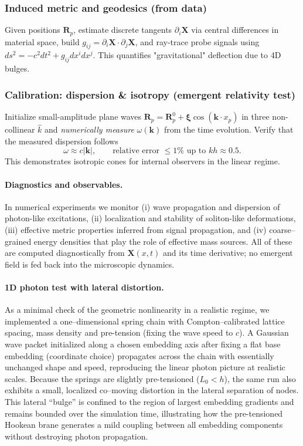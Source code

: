 \subsubsection{Induced metric and geodesics (from data)}\label{induced-metric-and-geodesics}

Given positions $\mathbf R_p$, estimate discrete tangents $\partial_i\mathbf X$ via central differences in material space, build $g_{ij}=\partial_i\mathbf X\cdot\partial_j\mathbf X$, and ray-trace probe signals using $ds^2=-c^2dt^2+g_{ij}dx^i dx^j$. This quantifies "gravitational" deflection due to 4D bulges.

\subsubsection{Calibration: dispersion \& isotropy (emergent relativity test)}\label{calibration-dispersion-isotropy}

Initialize small-amplitude plane waves $\mathbf R_p=\mathbf R^0_p+\boldsymbol\xi\cos(\mathbf k\cdot x_p)$ in three non-collinear $\hat k$ and \emph{numerically measure} $\omega(\mathbf k)$ from the time evolution. Verify that the measured dispersion follows
\[
\omega \approx c|\mathbf k|,\qquad
\text{relative error } \le 1\% \text{ up to } kh\approx0.5.
\]
This demonstrates isotropic cones for internal observers in the linear regime.

\paragraph{Diagnostics and observables.}
In numerical experiments we monitor (i) wave propagation and dispersion of
photon-like excitations, (ii) localization and stability of soliton-like
deformations, (iii) effective metric properties inferred from signal
propagation, and (iv) coarse–grained energy densities that play the role of
effective mass sources. All of these are computed diagnostically from
$\mathbf X(x,t)$ and its time derivative; no emergent field is fed back into
the microscopic dynamics.

\paragraph{1D photon test with lateral distortion.}
As a minimal check of the geometric nonlinearity in a realistic regime, we
implemented a one–dimensional spring chain with Compton–calibrated lattice
spacing, mass density and pre-tension (fixing the wave speed to $c$). A
Gaussian wave packet initialized along a chosen embedding axis after fixing a flat base embedding (coordinate choice) propagates across the
chain with essentially unchanged shape and speed, reproducing the linear
photon picture at realistic scales. Because the springs are slightly
pre-tensioned ($L_0 < h$), the same run also exhibits a small, localized
co–moving distortion in the lateral separation of nodes. This lateral
``bulge'' is confined to the region of largest embedding gradients and remains
bounded over the simulation time, illustrating how the pre-tensioned
Hookean brane generates a mild coupling between all embedding
components without destroying photon propagation.

